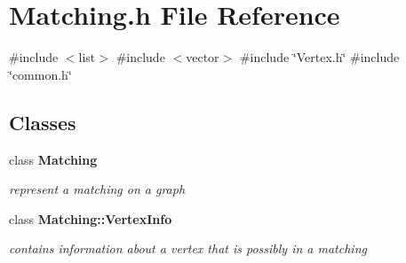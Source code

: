 \section{Matching.\+h File Reference}
\label{Matching_8h}
{\ttfamily \#include $<$list$>$}\newline
{\ttfamily \#include $<$vector$>$}\newline
{\ttfamily \#include \char`\"{}Vertex.\+h\char`\"{}}\newline
{\ttfamily \#include \char`\"{}common.\+h\char`\"{}}\newline
\subsection*{Classes}
\begin{DoxyCompactItemize}
\item 
class \textbf{ Matching}
\begin{DoxyCompactList}\small\item\em represent a matching on a graph \end{DoxyCompactList}\item 
class \textbf{ Matching\+::\+Vertex\+Info}
\begin{DoxyCompactList}\small\item\em contains information about a vertex that is possibly in a matching \end{DoxyCompactList}\end{DoxyCompactItemize}
